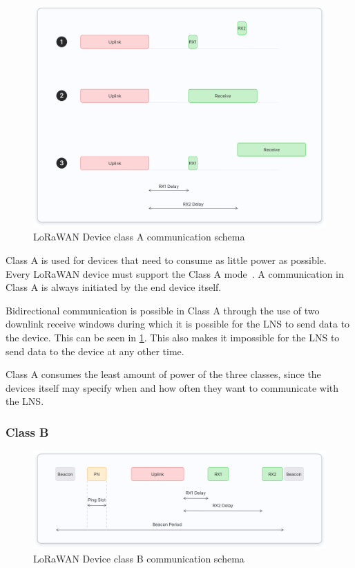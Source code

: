 \begin{figure}[h]
    \centering
    \includegraphics[width=1\textwidth]{pictures/device-classes/class-a.png}
    \caption{\ac{LoRaWAN} Device class A communication schema~\protect\cite{the_things_industries_bv_device_nodate}}\label{pic:lorawan-device-class-a-schema}
\end{figure}

Class A is used for devices that need to consume as little power as possible.
Every \ac{LoRaWAN} device must support the Class A mode~\cite[p. 11]{lora_alliance_inc_lorawan_2017}.
A communication in Class A is always initiated by the end device itself.

Bidirectional communication is possible in Class A through the use of two downlink receive windows during which it is possible for the \ac{LNS} to send data to the device.
This can be seen in \cref{pic:lorawan-device-class-a-schema}.
This also makes it impossible for the \ac{LNS} to send data to the device at any other time.

Class A consumes the least amount of power of the three classes, since the devices itself may specify when and how often they want to communicate with the \ac{LNS}.

\subsubsection{Class B}

\begin{figure}[h]
    \centering
    \includegraphics[width=1\textwidth]{pictures/device-classes/class-b.png}
    \caption{\ac{LoRaWAN} Device class B communication schema~\protect\cite{the_things_industries_bv_device_nodate}}\label{pic:lorawan-device-class-b-schema}
\end{figure}

